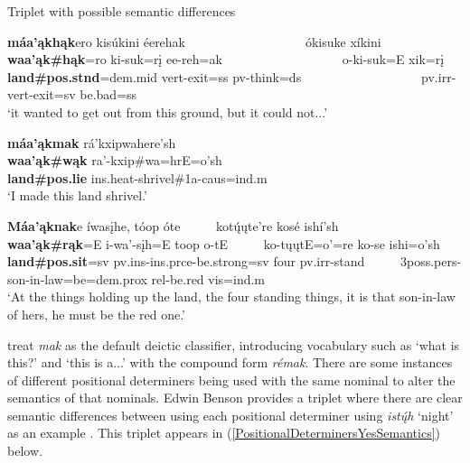 \begin{exe}
    \item\label{PositionalDeterminersNoSemantics} Triplet with possible semantic differences

    \begin{xlist}
        \item\label{PositionalDeterminersNoSemanticsA} \glll \textbf{máa'ąkhąk}ero kisúkini éerehak ~ ~ ~ ~ ~ ~ ~ ~ ~ ~ ~ ókisuke xíkini\\
        \textbf{waa'ąk\#hąk}=ro ki-suk=rį ee-reh=ak ~ ~ ~ ~ ~ ~ ~ ~ ~ ~ ~ o-ki-suk=E xik=rį\\
        \textnormal{\bfseries land}\textbf{\#pos.stnd}=dem.mid vert-\textnormal{exit}=ss pv-\textnormal{think}=ds ~ ~ ~ ~ ~ ~ ~ ~ ~ ~ ~   pv.irr-vert-\textnormal{exit}=sv \textnormal{be.bad}=ss\\
        \glt `it wanted to get out from this ground, but it could not...' \citep[154]{hollow1973a}

        \item\label{PositionalDeterminersNoSemanticsB} \glll \textbf{máa'ąkmak} rá'kxipwahere'sh\\
        \textbf{waa'ąk\#wąk} ra'-kxip\#wa=hrE=o'sh\\
        \textnormal{\bfseries land}\textbf{\#pos.lie} ins.heat-\textnormal{shrivel}\#1a-caus=ind.m\\
        \glt `I made this land shrivel.' \citep[217]{hollow1973a}

        \item\label{PositionalDeterminersNoSemanticsC} \glll \textbf{Máa'ąknak}e íwasįhe, tóop óte ~ ~ ~ kotų́ųte're kosé ishí'sh\\
        \textbf{waa'ąk\#rąk}=E i-wa'-sįh=E toop o-tE ~ ~ ~ ko-tųųtE=o'=re ko-se ishi=o'sh\\
        \textnormal{\bfseries land}\textbf{\#pos.sit}=sv pv.ins-ins.prce-\textnormal{be.strong}=sv \textnormal{four} pv.irr-\textnormal{stand} ~ ~ ~ 3poss.pers-\textnormal{son-in-law}=\textnormal{be}=dem.prox rel-\textnormal{be.red} vis=ind.m\\
        \glt `At the things holding up the land, the four standing things, it is that son-in-law of hers, he must be the red one.' \citep[122]{hollow1973a}

        
    \end{xlist}
\end{exe}

\citet{hollow1976} treat \textit{mak} as the default deictic classifier, introducing vocabulary such as `what is this?' and `this is a...' with the compound form \textit{rémak}. There are some instances of different positional determiners being used with the same nominal to alter the semantics of that nominals. Edwin Benson provides a triplet where there are clear semantic differences between using each positional determiner using \textit{istų́h} `night' as an example \citep[42]{trechter2012}. This triplet appears in (\ref{PositionalDeterminersYesSemantics}) below.

